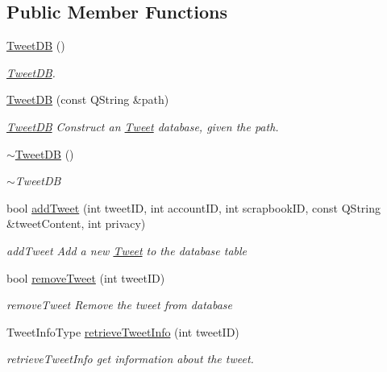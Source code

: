 \subsection*{Public Member Functions}
\begin{DoxyCompactItemize}
\item 
\hyperlink{classTweetDB_a3b93b88909955194aad67e163a149333}{Tweet\+DB} ()
\begin{DoxyCompactList}\small\item\em \hyperlink{classTweetDB}{Tweet\+DB}. \end{DoxyCompactList}\item 
\hyperlink{classTweetDB_a3b947c5f7244e552de0ad5d89e3fc663}{Tweet\+DB} (const Q\+String \&path)
\begin{DoxyCompactList}\small\item\em \hyperlink{classTweetDB}{Tweet\+DB} Construct an \hyperlink{classTweet}{Tweet} database, given the path. \end{DoxyCompactList}\item 
\hyperlink{classTweetDB_a238b869c0a328095b5eb65c36db4089e}{$\sim$\+Tweet\+DB} ()
\begin{DoxyCompactList}\small\item\em $\sim$\+Tweet\+DB \end{DoxyCompactList}\item 
bool \hyperlink{classTweetDB_a9e46391c80b40b85c38c3259c325cef4}{add\+Tweet} (int tweet\+ID, int account\+ID, int scrapbook\+ID, const Q\+String \&tweet\+Content, int privacy)
\begin{DoxyCompactList}\small\item\em add\+Tweet Add a new \hyperlink{classTweet}{Tweet} to the database table \end{DoxyCompactList}\item 
bool \hyperlink{classTweetDB_a033495196bb96818330bc0d1a513cebc}{remove\+Tweet} (int tweet\+ID)
\begin{DoxyCompactList}\small\item\em remove\+Tweet Remove the tweet from database \end{DoxyCompactList}\item 
Tweet\+Info\+Type \hyperlink{classTweetDB_ad65a5c85629c879a625bebcaf9441c77}{retrieve\+Tweet\+Info} (int tweet\+ID)
\begin{DoxyCompactList}\small\item\em retrieve\+Tweet\+Info get information about the tweet. \end{DoxyCompactList}\item 

\end{DoxyCompactItemize}
